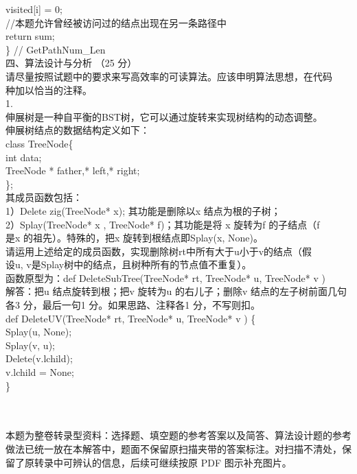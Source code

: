 \begin{question}
visited[i] = 0;\\
//本题允许曾经被访问过的结点出现在另一条路径中\\
return sum;\\
\} // GetPathNum\_Len\\
四、算法设计与分析 （25 分）\\
请尽量按照试题中的要求来写高效率的可读算法。应该申明算法思想，在代码\\
种加以恰当的注释。\\
1.\\
伸展树是一种自平衡的BST树，它可以通过旋转来实现树结构的动态调整。\\
伸展树结点的数据结构定义如下：\\
class TreeNode\{\\
int  data;\\
TreeNode  * father,* left,* right;\\
\};\\
其成员函数包括：\\
1）Delete zig(TreeNode* x); 其功能是删除以x 结点为根的子树；\\
2）Splay(TreeNode* x , TreeNode* f)；其功能是将 x 旋转为f 的子结点（f\\
是x 的祖先）。特殊的，把x 旋转到根结点即Splay(x, None)。\\
请运用上述给定的成员函数，实现删除树rt中所有大于u小于v的结点（假\\
设u, v是Splay树中的结点，且树种所有的节点值不重复）。\\
函数原型为：def DeleteSubTree(TreeNode* rt, TreeNode* u, TreeNode* v )\\
解答：把u 结点旋转到根；把v 旋转为u 的右儿子；删除v 结点的左子树前面几句\\
各3 分，最后一句1 分。如果思路、注释各1 分，不写则扣。\\
def DeleteUV(TreeNode* rt, TreeNode* u, TreeNode* v ) \{\\
Splay(u, None);\\
Splay(v, u);\\
Delete(v.lchild);\\
v.lchild = None;\\
\}\\
\\
\

\begin{solution}
本题为整卷转录型资料：选择题、填空题的参考答案以及简答、算法设计题的参考做法已统一放在本解答中，题面不保留原扫描夹带的答案标注。对扫描不清处，保留了原转录中可辨认的信息，后续可继续按原 PDF 图示补充图片。


\end{solution}
\end{question}
